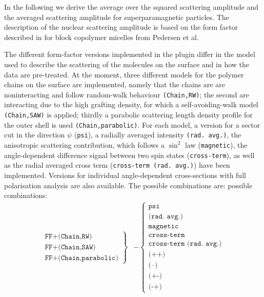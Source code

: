 In the following we derive the average over the squared scattering
amplitude and the averaged scattering amplitude for
superparamagnetic particles. The description of the nuclear
scattering amplitude is based on the form factor described in
\cite{PedersenGerstenberg96,PedersenJApplCryst2000} for block
copolymer micelles from Pedersen et al.

The different form-factor versions implemented in the plugin
differ in the model used to describe the scattering of the
molecules on the surface and in how the data are pre-treated. At the
moment, three different models for the polymer
chains on the surface are implemented, namely that the chains are
are noninteracting and follow random-walk behaviour \texttt{(Chain,RW)};
the second are interacting due to the high grafting density, for which
a self-avoiding-walk model \texttt{(Chain,SAW)} is applied;
thirdly a parabolic scattering length density profile for the outer
shell is used \texttt{(Chain,parabolic)}. For each model, a version
for a sector cut in the direction $\psi$ (\texttt{psi}), a radially
averaged intensity \texttt{(rad.~avg.)}, the anisotropic scattering
contribution, which follows a $\sin^2$ law (\texttt{magnetic}), the
angle-dependent difference signal between two spin states
(\texttt{cross-term}), as well as the radial averaged cross term
(\texttt{cross-term (rad.~avg.)}) have been implemented. Versions for
individual angle-dependent cross-sections with full polarisation
analysis are also available. The possible combinations are:
possible combinations:
\begin{align}
\left.
  \begin{array}{l}
    \texttt{FF+(Chain,RW)} \\
    \texttt{FF+(Chain,SAW)} \\
    \texttt{FF+(Chain,parabolic)}
  \end{array}
\right\} &-  \left\{
  \begin{array}{l}
    \texttt{psi} \\
    \texttt{(rad.~avg.)} \\
    \texttt{magnetic} \\
    \texttt{cross-term} \\
    \texttt{cross-term (rad.~avg.)} \\
    \texttt{(++)} \\
    \texttt{(--)} \\
    \texttt{(+-)} \\
    \texttt{(-+)}
  \end{array}
\right.
\end{align}

